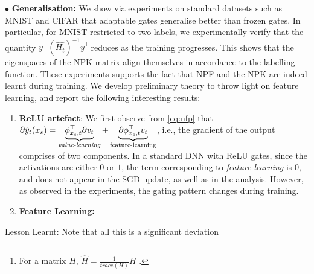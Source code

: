 \documentclass{article}
\begin{document}

$\bullet$ \textbf{Generalisation:} We show via experiments on standard datasets such as MNIST and CIFAR that adaptable gates generalise better than frozen gates. In particular, for MNIST restricted to two labels, we experimentally verify that the quantity $y^\top (\widehat{H_t})^{-1}y$\footnote{For a matrix $H$, $\hat{H}=\frac{1}{trace(H)}H$ .} reduces as the training progresses. This shows that the eigenspaces of the NPK matrix align themselves in accordance to the labelling function. These experiments supports the fact that NPF and the NPK are indeed learnt during training. We develop preliminary theory to throw light on feature learning, and report the following interesting results:
\begin{enumerate}
\item \textbf{ReLU artefact}: We first observe from \eqref{eq:nfp} that ${\partial}\hat{y}_t(x_s) =  \underbrace{\phi^\top_{x_s,t} {\partial} v_t}_{\text{\emph{value-learning}}}+\underbrace{{\partial} \phi^\top_{x_s,t} v_t}_{\text{feature-learning}}$, i.e., the gradient of the output comprises of two components. In a standard DNN with ReLU gates, since the activations are either $0$ or $1$,  the term corresponding to \emph{feature-learning} is $0$, and does not appear in the SGD update, as well as in the analysis. However, as observed in the experiments, the gating pattern changes during training. 
\item \textbf{Feature Learning:} 
\end{enumerate}





Lesson Learnt: Note that all this is a significant deviation


%
%

%
%
%
%


%
\end{document}
